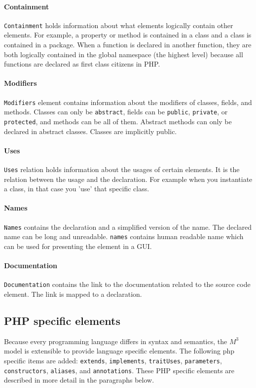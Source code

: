 \documentclass[../main.tex]{subfiles}
\begin{document}
    \paragraph{Containment} \texttt{Containment} holds information about what elements logically contain other elements.
    For example, a property or method is contained in a class and a class is contained in a package.
    When a function is declared in another function, they are both logically contained in the global namespace (the highest level) because all functions are declared as first class citizens in PHP.
    
    \paragraph{Modifiers} \texttt{Modifiers} element contains information about the modifiers of classes, fields, and methods. 
    Classes can only be \texttt{abstract}, fields can be \texttt{public}, \texttt{private}, or \texttt{protected}, and methods can be all of them. 
    Abstract methods can only be declared in abstract classes. 
    Classes are implicitly public.
    
    \paragraph{Uses} \texttt{Uses} relation holds information about the usages of certain elements.
    It is the relation between the usage and the declaration.
    For example when you instantiate a class, in that case you 'use' that specific class.
     
    \paragraph{Names} \texttt{Names} contains the declaration and a simplified version of the name.
    The declared name can be long and unreadable.
    \texttt{names} contains human readable name which can be used for presenting the element in a GUI.
    
    \paragraph{Documentation} \texttt{Documentation} contains the link to the documentation related to the source code element.
    The link is mapped to a declaration.
    
    \subsection{PHP specific elements}
    Because every programming language differs in syntax and semantics, the $M^3$ model is extensible to provide language specific elements.
    The following php specific items are added: \texttt{extends}, \texttt{implements}, \texttt{traitUses}, \texttt{parameters}, \texttt{constructors}, \texttt{aliases}, and \texttt{annotations}.
    These PHP specific elements are described in more detail in the paragraphs below.
\end{document}
